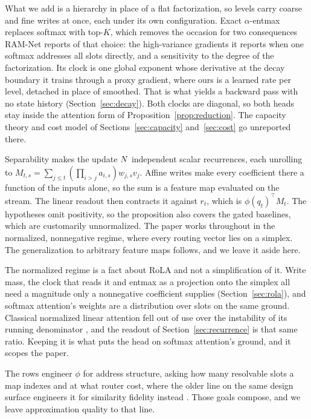 What we add is a hierarchy in place of a flat factorization, so levels carry coarse and fine writes at once, each under its own configuration. Exact $\alpha$-entmax replaces softmax with top-$K$, which removes the occasion for two consequences RAM-Net reports of that choice: the high-variance gradients it reports when one softmax addresses all slots directly, and a sensitivity to the degree of the factorization. Its clock is one global exponent whose derivative at the decay boundary it trains through a proxy gradient, where ours is a learned rate per level, detached in place of smoothed. That is what yields a backward pass with no state history (Section~\ref{sec:decay}). Both clocks are diagonal, so both heads stay inside the attention form of Proposition~\ref{prop:reduction}. The capacity theory and cost model of Sections~\ref{sec:capacity} and~\ref{sec:cost} go unreported there.

Separability makes the update $N$ independent scalar recurrences, each unrolling to $M_{t,s} = \textstyle\sum_{j \le t} (\prod_{i>j} a_{i,s}) w_{j,s} v_j$. Affine writes make every coefficient there a function of the inputs alone, so the sum is a feature map evaluated on the stream. The linear readout then contracts it against $r_t$, which is $\phi(q_t)^\top M_t$. The hypotheses omit positivity, so the proposition also covers the gated baselines, which are customarily unnormalized. The paper works throughout in the normalized, nonnegative regime, where every routing vector lies on a simplex. The generalization to arbitrary feature maps follows, and we leave it aside here.

The normalized regime is a fact about RoLA and not a simplification of it. Write mass, the clock that reads it and entmax as a projection onto the simplex all need a magnitude only a nonnegative coefficient supplies (Section~\ref{sec:rola}), and softmax attention's weights are a distribution over slots on the same ground. Classical normalized linear attention fell out of use over the instability of its running denominator \citep{katharopoulos2020}, and the readout of Section~\ref{sec:recurrence} is that same ratio. Keeping it is what puts the head on softmax attention's ground, and it scopes the paper.

The rows engineer $\phi$ for address structure, asking how many resolvable slots a map indexes and at what router cost, where the older line on the same design surface engineers it for similarity fidelity instead \citep{choromanski2021performer, arora2024based, zhang2024hedgehog}. Those goals compose, and we leave approximation quality to that line.

